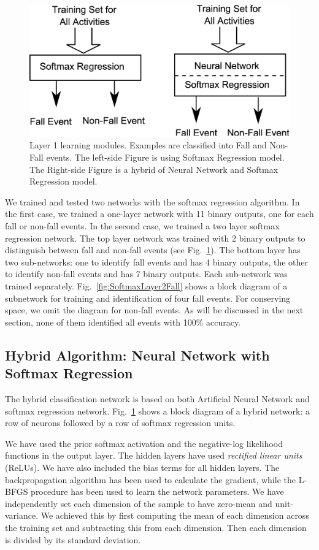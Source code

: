 \documentclass[]{IEEEtran}
\begin{document}
\begin{figure}[t]
	\centering
		\includegraphics[width=0.7\columnwidth]{figures/SoftmaxLayer1.eps}
	\caption{Layer 1 learning modules. Examples are classified into Fall
and Non-Fall events.  The left-side Figure is using Softmax Regression model.
The Right-side Figure is a hybrid of Neural Network and Softmax Regression
model.} \label{fig:SoftmaxLayer1}
\end{figure}

We trained and tested two networks with the softmax regression algorithm. In
the first case, we trained a one-layer network with 11 binary outputs, one for
each fall or non-fall events. In the second case, we trained a two layer
softmax regression network. The top layer network was trained with 2 binary
outputs to distinguish between fall and non-fall events (see
Fig.~\ref{fig:SoftmaxLayer1}). The bottom layer has two sub-networks:  one to
identify fall events and has 4 binary outputs, the other to identify non-fall
events and has 7 binary outputs. Each sub-network was trained separately.
Fig.~\ref{fig:SoftmaxLayer2Fall} shows a block diagram of a subnetwork for
training and identification of four fall events. For conserving space, we omit
the diagram for non-fall events. As will be discussed in the next section, none
of them identified all events with 100\% accuracy.


\subsection{Hybrid Algorithm: Neural Network with Softmax Regression}
\label{sec:HybridAlgorithmNeuralNetworkAndSoftmaxRegreation}

The hybrid classification network is based on both Artificial Neural Network
and softmax regression network. Fig.~\ref{fig:SoftmaxLayer1} shows a block
diagram of a hybrid network: a row of neurons followed by a row of softmax
regression units.  \par We have used the prior softmax activation  and the
negative-log likelihood functions in the output layer. The hidden layers have
used \emph{rectified linear units }(ReLUs).  We have also included the bias
terms for all hidden layers. The backpropagation algorithm\cite{Sarkar1995} has
been used to calculate the gradient, while the L-BFGS procedure has been used
to learn the network parameters. We have independently set each dimension of
the sample to have zero-mean and unit-variance. We achieved this by first
computing the mean of each dimension across the training set and subtracting
this from each dimension. Then each dimension is divided by its standard
deviation.       
\end{document}
